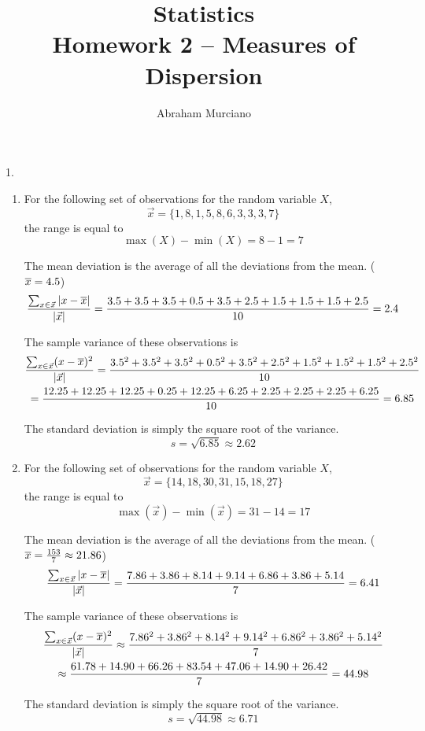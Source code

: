 \documentclass[fleqn]{article}
\title{
	Statistics \\
	\medskip
	\large Homework 2 -- Measures of Dispersion
}
\author{Abraham Murciano}
\begin{document}
\maketitle

\begin{answers}

    \item[1.]
    \begin{enumerate}
		\item %
		For the following set of observations for the random variable \(X\),
		\[\vec{x} = \{1,8,1,5,8,6,3,3,3,7\}\]
		the range is equal to
		\[\max(X) - \min(X) = 8 - 1 = 7\]

		The mean deviation is the average of all the deviations from the mean. (\(\overline{x} = 4.5\))
		\[\frac{\sum_{x \in \vec{x}}|x - \overline{x}|}{|\vec{x}|} = \frac{3.5+3.5+3.5+0.5+3.5+2.5+1.5+1.5+1.5+2.5}{10} = 2.4\]

		The sample variance of these observations is
		\begin{multline*}
			\frac{\sum_{x \in \vec{x}}(x - \overline{x})^2}{|\vec{x}|} = \frac{3.5^2+3.5^2+3.5^2+0.5^2+3.5^2+2.5^2+1.5^2+1.5^2+1.5^2+2.5^2}{10} \\= \frac{12.25+12.25+12.25+0.25+12.25+6.25+2.25+2.25+2.25+6.25}{10} = 6.85
		\end{multline*}

		The standard deviation is simply the square root of the variance.
		\[s = \sqrt{6.85} \approx 2.62\]

		\item %
		For the following set of observations for the random variable \(X\),
		\[\vec{x} = \{14,18,30,31,15,18,27\}\]
		the range is equal to
		\[\max(\vec{x}) - \min(\vec{x}) = 31 - 14 = 17\]

		The mean deviation is the average of all the deviations from the mean. (\(\overline{x} = \frac{153}{7} \approx 21.86\))
		\[\frac{\sum_{x \in \vec{x}}|x - \overline{x}|}{|\vec{x}|} = \frac{7.86+3.86+8.14+9.14+6.86+3.86+5.14}{7} = 6.41\]

		The sample variance of these observations is
		\begin{multline*}
			\frac{\sum_{x \in \vec{x}}(x - \overline{x})^2}{|\vec{x}|} \approx \frac{7.86^2+3.86^2+8.14^2+9.14^2+6.86^2+3.86^2+5.14^2}{7} \\\approx \frac{61.78+14.90+66.26+83.54+47.06+14.90+26.42}{7} = 44.98
		\end{multline*}

		The standard deviation is simply the square root of the variance.
		\[s = \sqrt{44.98} \approx 6.71\]
	\end{enumerate}


\end{answers}
\end{document}
